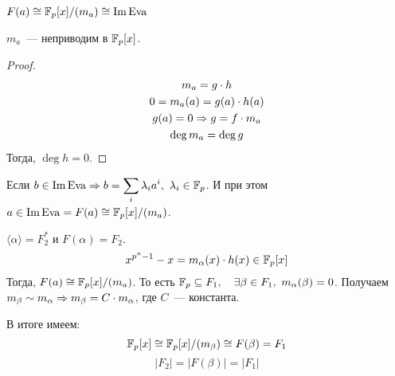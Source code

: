 \begin{lemma}
  $F(a) \cong \mathbb{F}_p[x]/(m_a) \cong \operatorname{Im} \operatorname{Eva}$
\end{lemma}

\begin{proposition}
  $m_a$~--- неприводим в $\mathbb{F}_p[x]$.
\end{proposition}

\begin{proof}
  \begin{gather}
    m_a = g \cdot h \\
    0 = m_a(a) = g(a) \cdot h(a) \\
    g(a) = 0 \Rightarrow g = f \cdot m_a \\
    \deg m_a = \deg g
  \end{gather}
  Тогда, $\deg h = 0$.
\end{proof}

Если $b \in \operatorname{Im} \operatorname{Eva} \Rightarrow b = \displaystyle{\sum_{i} \lambda_i a^i, \ \lambda_i \in \mathbb{F}_p}$. И при этом $a \in \operatorname{Im} \operatorname{Eva} = F(a) \cong \mathbb{F}_p[x]/(m_a)$.

\begin{proposition}
  $\langle \alpha \rangle = F_2^{*}$ и $F(\alpha) = F_2$.
  \[x^{p^n - 1} - x = m_\alpha (x) \cdot h(x) \in \mathbb{F}_p[x]\]
  Тогда, $F(a) \cong \mathbb{F}_p[x] / (m_a)$. То есть $\mathbb{F}_p \subseteq F_1, \quad \exists \beta \in F_1, \ m_\alpha(\beta) = 0$. Получаем $m_\beta \sim m_\alpha \Rightarrow m_\beta = C \cdot m_\alpha$, где $C$~--- константа.

  В итоге имеем:
  \[\mathbb{F}_p[x] \cong \mathbb{F}_p[x] / (m_\beta) \cong F(\beta) = F_1\]
  \[|F_2| = |F(\beta)| = |F_1|\]
\end{proposition}




